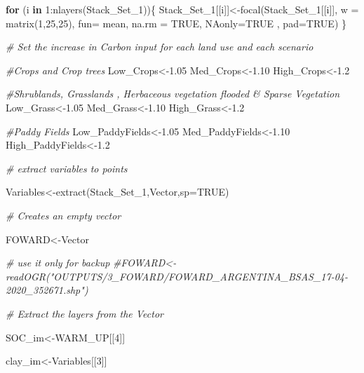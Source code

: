 \documentclass[
  10pt,
  b5paper,
]{book}
\newenvironment{Shaded}{\begin{snugshade}}{\end{snugshade}}
\newcommand{\AttributeTok}[1]{\textcolor[rgb]{0.77,0.63,0.00}{#1}}
\newcommand{\CommentTok}[1]{\textcolor[rgb]{0.56,0.35,0.01}{\textit{#1}}}
\newcommand{\ConstantTok}[1]{\textcolor[rgb]{0.00,0.00,0.00}{#1}}
\newcommand{\ControlFlowTok}[1]{\textcolor[rgb]{0.13,0.29,0.53}{\textbf{#1}}}
\newcommand{\DecValTok}[1]{\textcolor[rgb]{0.00,0.00,0.81}{#1}}
\newcommand{\FloatTok}[1]{\textcolor[rgb]{0.00,0.00,0.81}{#1}}
\newcommand{\FunctionTok}[1]{\textcolor[rgb]{0.00,0.00,0.00}{#1}}
\newcommand{\NormalTok}[1]{#1}
\newcommand{\OtherTok}[1]{\textcolor[rgb]{0.56,0.35,0.01}{#1}}
\newcommand{\SpecialCharTok}[1]{\textcolor[rgb]{0.00,0.00,0.00}{#1}}
\begin{document}
\begin{Shaded}
\begin{Highlighting}[]
\ControlFlowTok{for}\NormalTok{ (i }\ControlFlowTok{in} \DecValTok{1}\SpecialCharTok{:}\FunctionTok{nlayers}\NormalTok{(Stack\_Set\_1))\{}
\NormalTok{  Stack\_Set\_1[[i]]}\OtherTok{\textless{}{-}}\FunctionTok{focal}\NormalTok{(Stack\_Set\_1[[i]], }\AttributeTok{w =} \FunctionTok{matrix}\NormalTok{(}\DecValTok{1}\NormalTok{,}\DecValTok{25}\NormalTok{,}\DecValTok{25}\NormalTok{), }\AttributeTok{fun=}\NormalTok{ mean,  }\AttributeTok{na.rm =} \ConstantTok{TRUE}\NormalTok{, }\AttributeTok{NAonly=}\ConstantTok{TRUE}\NormalTok{ , }\AttributeTok{pad=}\ConstantTok{TRUE}\NormalTok{)}
\NormalTok{\}}


\CommentTok{\# Set the increase in Carbon input for each land use and each scenario}

\CommentTok{\#Crops and Crop trees}
\NormalTok{Low\_Crops}\OtherTok{\textless{}{-}}\FloatTok{1.05}
\NormalTok{Med\_Crops}\OtherTok{\textless{}{-}}\FloatTok{1.10}
\NormalTok{High\_Crops}\OtherTok{\textless{}{-}}\FloatTok{1.2}

\CommentTok{\#Shrublands, Grasslands , Herbaceous vegetation flooded \& Sparse Vegetation}
\NormalTok{Low\_Grass}\OtherTok{\textless{}{-}}\FloatTok{1.05}
\NormalTok{Med\_Grass}\OtherTok{\textless{}{-}}\FloatTok{1.10}
\NormalTok{High\_Grass}\OtherTok{\textless{}{-}}\FloatTok{1.2}

\CommentTok{\#Paddy Fields}
\NormalTok{Low\_PaddyFields}\OtherTok{\textless{}{-}}\FloatTok{1.05}
\NormalTok{Med\_PaddyFields}\OtherTok{\textless{}{-}}\FloatTok{1.10}
\NormalTok{High\_PaddyFields}\OtherTok{\textless{}{-}}\FloatTok{1.2}

\CommentTok{\# extract variables to points}

\NormalTok{Variables}\OtherTok{\textless{}{-}}\FunctionTok{extract}\NormalTok{(Stack\_Set\_1,Vector,}\AttributeTok{sp=}\ConstantTok{TRUE}\NormalTok{)}

\CommentTok{\# Creates an empty vector}

\NormalTok{FOWARD}\OtherTok{\textless{}{-}}\NormalTok{Vector}

\CommentTok{\# use it only for backup}
\CommentTok{\#FOWARD\textless{}{-}readOGR("OUTPUTS/3\_FOWARD/FOWARD\_ARGENTINA\_BSAS\_17{-}04{-}2020\_352671.shp")}

\CommentTok{\# Extract the layers from the Vector}

\NormalTok{SOC\_im}\OtherTok{\textless{}{-}}\NormalTok{WARM\_UP[[}\DecValTok{4}\NormalTok{]]}

\NormalTok{clay\_im}\OtherTok{\textless{}{-}}\NormalTok{Variables[[}\DecValTok{3}\NormalTok{]] }


\end{Highlighting}
\end{Shaded}
\end{document}
